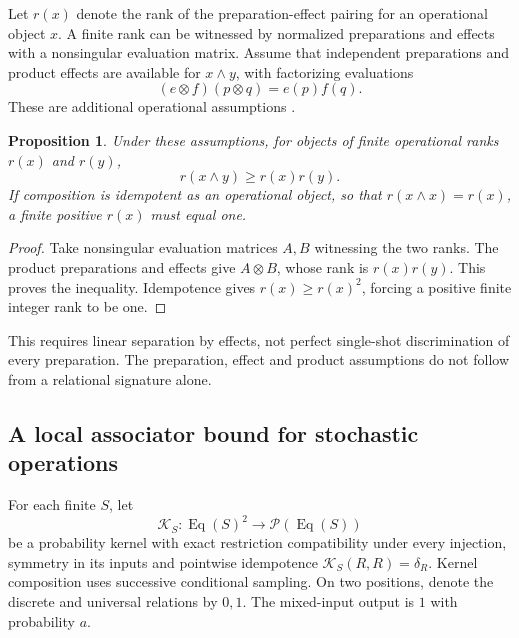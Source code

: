 \documentclass[11pt,letterpaper]{article}
\newtheorem{proposition}[theorem]{Proposition}
\begin{document}
Let \(r(x)\) denote the rank of the preparation-effect pairing for an
operational object \(x\). A finite rank can be witnessed by normalized
preparations and effects with a nonsingular evaluation matrix.
Assume that independent preparations and product effects are available
for \(x\wedge y\), with factorizing evaluations
\[
 (e\otimes f)(p\otimes q)=e(p)f(q).
\]
These are additional operational assumptions \cite{internalcandidate}.

\begin{proposition}
Under these assumptions, for objects of finite operational ranks \(r(x)\) and \(r(y)\),
\[
 r(x\wedge y)\ge r(x)r(y).
\]
If composition is idempotent as an operational object, so that
\(r(x\wedge x)=r(x)\), a finite positive \(r(x)\) must equal one.
\end{proposition}
\begin{proof}
Take nonsingular evaluation matrices \(A,B\) witnessing the two ranks.
The product preparations and effects give \(A\otimes B\), whose rank is
\(r(x)r(y)\). This proves the inequality.
Idempotence gives \(r(x)\ge r(x)^2\), forcing a positive finite integer
rank to be one.
\end{proof}

This requires linear separation by effects, not perfect single-shot
discrimination of every preparation. The preparation, effect and product
assumptions do not follow from a relational signature alone.

\subsection{A local associator bound for stochastic operations}

For each finite \(S\), let
\[
 \mathcal K_S:\operatorname{Eq}(S)^2
 \longrightarrow\mathcal P(\operatorname{Eq}(S))
\]
be a probability kernel with exact restriction compatibility under every
injection, symmetry in its inputs and pointwise idempotence
\(\mathcal K_S(R,R)=\delta_R\). Kernel composition uses successive
conditional sampling. On two positions, denote the discrete and universal
relations by \(0,1\). The mixed-input output is \(1\) with probability \(a\).
\end{document}
